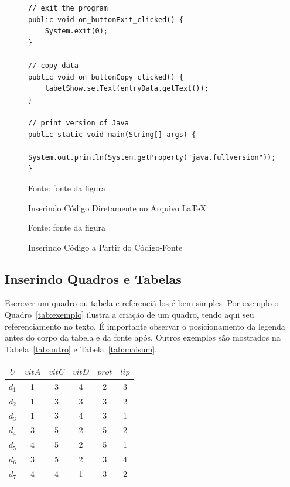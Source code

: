 \begin{figure}[!htb]
\centering
\caption{Inserindo Código Diretamente no Arquivo \LaTeX} %
\begin{lstlisting}
// exit the program
public void on_buttonExit_clicked() {
	System.exit(0);
}

// copy data
public void on_buttonCopy_clicked() {
	labelShow.setText(entryData.getText());
}

// print version of Java
public static void main(String[] args) {
	System.out.println(System.getProperty("java.fullversion"));
}
\end{lstlisting} 
{\small Fonte: fonte da figura} %
\label{fig:exemplocodigo1} %
\end{figure}


\begin{figure}[H]
\centering
\caption{Inserindo Código a Partir do Código-Fonte} %
\label{fig:exemplocodigo2} %

{\small Fonte: fonte da figura} %
\end{figure}

\subsection{Inserindo Quadros e Tabelas}

Escrever um quadro ou tabela e referenciá-los é bem simples. Por exemplo o Quadro~\ref{tab:exemplo} ilustra a criação de um quadro, tendo aqui seu referenciamento no texto. É importante observar o posicionamento da legenda antes do corpo da tabela e da fonte após. Outros exemplos são mostrados na Tabela~\ref{tab:outro} e Tabela~\ref{tab:maisum}.

\begin{quadro}[htb]
  \begin{center}
    \caption{Exemplo de Quadro} 
    \label{tab:exemplo}
    \vspace{0.2cm}
    \footnotesize
    \begin{tabular}{|c|c|c|c|c|c|}
      \hline
      $U$ & $vitA$ & $vitC$ & $vitD$ & $prot$ & $lip$ \\
      \hline
      \hline
      $d_1$ & 1 & 3 & 4 & 2 & 3\\
      $d_2$ & 1 & 3 & 3 & 3 & 2\\
      $d_3$ & 1 & 3 & 4 & 3 & 1\\
      $d_4$ & 3 & 5 & 2 & 5 & 2\\
      $d_5$ & 4 & 5 & 2 & 5 & 1\\
      $d_6$ & 3 & 5 & 2 & 3 & 4\\
      $d_7$ & 4 & 4 & 1 & 3 & 2\\
      \hline 
    \end{tabular}
  \end{center}
\end{quadro}

